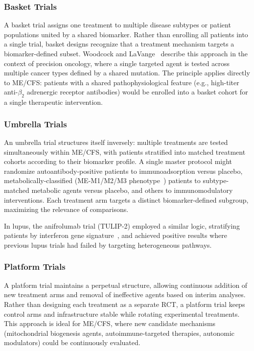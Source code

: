 \subsubsection{Basket Trials}

A basket trial assigns one treatment to multiple disease subtypes or patient populations united by a shared biomarker. Rather than enrolling all patients into a single trial, basket designs recognize that a treatment mechanism targets a biomarker-defined subset. Woodcock and LaVange~\cite{Woodcock2017} describe this approach in the context of precision oncology, where a single targeted agent is tested across multiple cancer types defined by a shared mutation. The principle applies directly to ME/CFS: patients with a shared pathophysiological feature (e.g., high-titer anti-$\beta_2$ adrenergic receptor antibodies) would be enrolled into a basket cohort for a single therapeutic intervention.

\subsubsection{Umbrella Trials}

An umbrella trial structures itself inversely: multiple treatments are tested simultaneously within ME/CFS, with patients stratified into matched treatment cohorts according to their biomarker profile. A single master protocol might randomize autoantibody-positive patients to immunoadsorption versus placebo, metabolically-classified (ME-M1/M2/M3 phenotype~\cite{Germain2020metabolic}) patients to subtype-matched metabolic agents versus placebo, and others to immunomodulatory interventions. Each treatment arm targets a distinct biomarker-defined subgroup, maximizing the relevance of comparisons.

In lupus, the anifrolumab trial (TULIP-2) employed a similar logic, stratifying patients by interferon gene signature~\cite{Morand2020}, and achieved positive results where previous lupus trials had failed by targeting heterogeneous pathways.

\subsubsection{Platform Trials}

A platform trial maintains a perpetual structure, allowing continuous addition of new treatment arms and removal of ineffective agents based on interim analyses. Rather than designing each treatment as a separate RCT, a platform trial keeps control arms and infrastructure stable while rotating experimental treatments. This approach is ideal for ME/CFS, where new candidate mechanisms (mitochondrial biogenesis agents, autoimmune-targeted therapies, autonomic modulators) could be continuously evaluated.

